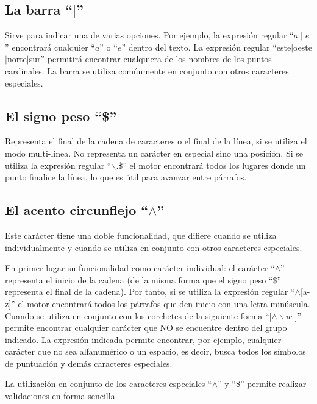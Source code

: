 \subsection{La barra ``$\mid$''}

Sirve para indicar una de varias opciones.
Por ejemplo,
la expresión regular ``$a\mid e$'' encontrará cualquier ``$a$'' o ``$e$'' dentro del texto.
La expresión regular ``este$\mid$oeste$\mid$norte$\mid$sur'' permitirá encontrar cualquiera de los nombres de los puntos cardinales.
La barra se utiliza comúnmente en conjunto con otros caracteres especiales.

\subsection{El signo peso ``\$''}

Representa el final de la cadena de caracteres o el final de la línea,
si se utiliza el modo multi-línea.
No representa un carácter en especial sino una posición.
Si se utiliza la expresión regular ``$\backslash .$\$'' el motor encontrará todos los lugares donde un punto finalice la línea,
lo que es útil para avanzar entre párrafos.

\subsection{El acento circunflejo ``$\wedge$''}

Este carácter tiene una doble funcionalidad,
que difiere cuando se utiliza individualmente y cuando se utiliza en conjunto con otros caracteres especiales.

En primer lugar su funcionalidad como carácter individual:
el carácter ``$\wedge$'' representa el inicio de la cadena
(de la misma forma que el signo peso ``\$'' representa el final de la cadena).
Por tanto,
si se utiliza la expresión regular ``$\wedge$[a-z]''
el motor encontrará todos los párrafos que den inicio con una letra minúscula.
Cuando se utiliza en conjunto con los corchetes de la siguiente forma ``[$\wedge\backslash w$ ]'' permite encontrar cualquier carácter
que NO se encuentre dentro del grupo indicado.
La expresión indicada permite encontrar,
por ejemplo,
cualquier carácter que no sea alfanumérico o un espacio,
es decir,
busca todos los símbolos de puntuación y demás caracteres especiales.

La utilización en conjunto de los caracteres especiales ``$\wedge$'' y ``\$'' permite realizar validaciones en forma sencilla.

